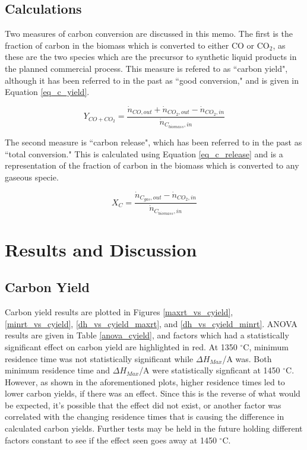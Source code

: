 \documentclass[11pt,twocolumn]{article}
\begin{document}
\subsection*{Calculations}

Two measures of carbon conversion are discussed in this memo.  The first is the fraction of carbon in the biomass which is converted to either CO or CO$_2$, as these are the two species which are the precursor to synthetic liquid products in the planned commercial process.  This measure is refered to as ``carbon yield", although it has been referred to in the past as ``good conversion," and is given in Equation \ref{eq_c_yield}.

\begin{equation}
	Y_{CO+CO_2} = \frac{\dot{n}_{CO,out}+\dot{n}_{CO_2,out} - \dot{n}_{CO_2,in}}{\dot{n}_{C_{biomass},in}}
	\label{eq_c_yield}
\end{equation}

The second measure is ``carbon release", which has been referred to in the past as ``total conversion."  This is calculated using Equation \ref{eq_c_release} and is a representation of the fraction of carbon in the biomass which is converted to any gaseous specie.

\begin{equation}
	X_{C} = \frac{\dot{n}_{C_{gas},out}- \dot{n}_{CO_2,in}}{\dot{n}_{C_{biomass},in}}
	\label{eq_c_release}
\end{equation}

\section*{Results and Discussion}

\subsection*{Carbon Yield}

Carbon yield results are plotted in Figures \ref{maxrt_vs_cyield}, \ref{minrt_vs_cyield}, \ref{dh_vs_cyield_maxrt}, and \ref{dh_vs_cyield_minrt}.  ANOVA results are given in Table \ref{anova_cyield}, and factors which had a statistically significant effect on carbon yield are highlighted in red.  At 1350 $^\circ$C, minimum residence time was not statistically significant while $\Delta H_{Max}$/A was.  Both minimum residence time and $\Delta H_{Max}$/A were statistically signficant at 1450 $^\circ$C.  However, as shown in the aforementioned plots, higher residence times led to lower carbon yields, if there was an effect.  Since this is the reverse of what would be expected, it's possible that the effect did not exist, or another factor was correlated with the changing residence times that is causing the difference in calculated carbon yields.  Further tests may be held in the future holding different factors constant to see if the effect seen goes away at 1450 $^\circ$C.
\end{document}
